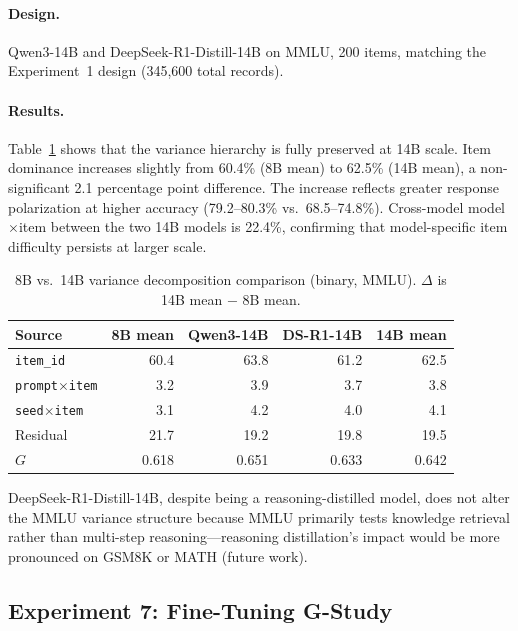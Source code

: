 \documentclass[letterpaper]{article}
\newcommand{\gcoeff}{\ensuremath{G}}
\newcommand{\pct}{\%}
\begin{document}
\paragraph{Design.}
Qwen3-14B and DeepSeek-R1-Distill-14B on MMLU, 200 items, matching the Experiment~1 design (345,600 total records).

\paragraph{Results.}
Table~\ref{tab:scale} shows that the variance hierarchy is fully preserved at 14B scale.
Item dominance increases slightly from 60.4\pct{} (8B mean) to 62.5\pct{} (14B mean), a non-significant 2.1 percentage point difference.
The increase reflects greater response polarization at higher accuracy (79.2--80.3\pct{} vs.\ 68.5--74.8\pct{}).
Cross-model model$\times$item between the two 14B models is 22.4\pct{}, confirming that model-specific item difficulty persists at larger scale.

\begin{table}[t]
\centering
\caption{8B vs.\ 14B variance decomposition comparison (binary, MMLU). $\Delta$ is 14B mean $-$ 8B mean.}
\label{tab:scale}
\small
\begin{tabular}{lrrrr}
\toprule
Source & 8B mean & Qwen3-14B & DS-R1-14B & 14B mean \\
\midrule
\texttt{item\_id}           & 60.4 & 63.8 & 61.2 & 62.5 \\
\texttt{prompt$\times$item} & 3.2  & 3.9  & 3.7  & 3.8  \\
\texttt{seed$\times$item}   & 3.1  & 4.2  & 4.0  & 4.1  \\
Residual                     & 21.7 & 19.2 & 19.8 & 19.5 \\
\midrule
$\gcoeff{}$                  & 0.618 & 0.651 & 0.633 & 0.642 \\
\bottomrule
\end{tabular}
\end{table}

DeepSeek-R1-Distill-14B, despite being a reasoning-distilled model, does not alter the MMLU variance structure because MMLU primarily tests knowledge retrieval rather than multi-step reasoning---reasoning distillation's impact would be more pronounced on GSM8K or MATH (future work).

\subsection{Experiment 7: Fine-Tuning G-Study}
\end{document}
